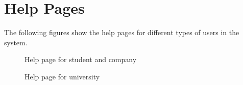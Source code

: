 \section{Help Pages}
The following figures show the help pages for different types of users in the system.

\begin{figure}[H]
    \centering
    \caption*{Help page for student and company}
\end{figure}

\begin{figure}[H]
    \centering
    \caption*{Help page for university}
\end{figure}
